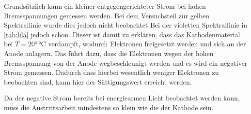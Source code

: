Grundsätzlich kann ein kleiner entgegengerichteter Strom bei hohen Bremsspannungen gemessen werden. Bei dem Versuchsteil zur gelben Spektrallinie wurde dies jedoch nicht beobachtet 
Bei der violetten Spektrallinie in \autoref{tab:lila} jedoch schon. Dieser ist damit zu erklären, dass das Kathodenmaterial bei $T=20°\,\unit{\celsius}$ 
verdampft, wodurch Elektronen freigesetzt werden und sich an der Anode anlagern. Das führt dazu, dass die Elektronen wegen der hohen Bremsspannung von der 
Anode wegbeschleunigt werden und es wird ein negativer Strom gemessen. Dadurch dass hierbei wesentlich weniger Elektronen zu beobachten sind, kann hier 
der Sättigungswert erreicht werden. 

Da der negative Strom bereits bei energiearmen Licht beobachtet werden kann, muss die Austrittsarbeit mindestens so klein wie die der Kathode sein.